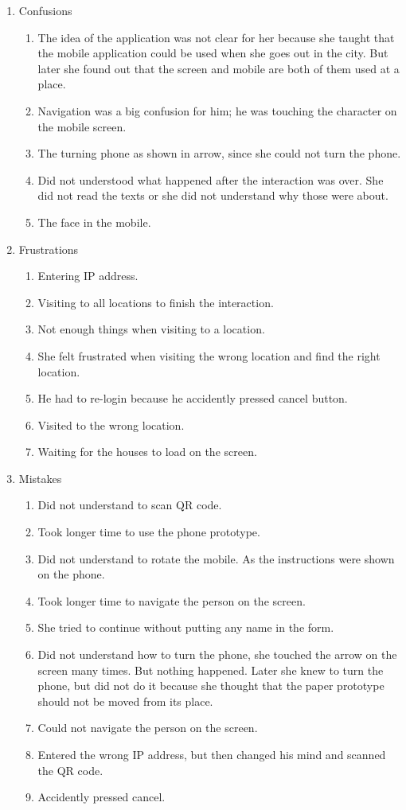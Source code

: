 \begin{enumerate}

\item Confusions
\begin{enumerate}
\item  The idea of the application was not clear for her because she taught that the mobile application could be used when she goes out in the city. But later she found out that the screen and mobile are both of them used at a place.
\item  Navigation was a big confusion for him; he was touching the character on the mobile screen.
\item  The turning phone as shown in arrow, since she could not turn the phone.
\item  Did not understood what happened after the interaction was over. She did not read the texts or she did not understand why those were about.
\item  The face in the mobile.
\end{enumerate}

\item Frustrations
\begin{enumerate}
\item  Entering IP address.
\item  Visiting to all locations to finish the interaction.
\item  Not enough things when visiting to a location.
\item  She felt frustrated when visiting the wrong location and find the right location.
\item  He had to re-login because he accidently pressed cancel button.
\item  Visited to the wrong location.
\item  Waiting for the houses to load on the screen.
\end{enumerate}

\item Mistakes
\begin{enumerate}
\item  Did not understand to scan QR code.
\item  Took longer time to use the phone prototype. 
\item  Did not understand to rotate the mobile. As the instructions were shown on the phone.
\item  Took longer time to navigate the person on the screen.
\item  She tried to continue without putting any name in the form.
\item  Did not understand how to turn the phone, she touched the arrow on the screen many times. But nothing happened. Later she knew to turn the phone, but did not do it because she thought that the paper prototype should not be moved from its place.
\item  Could not navigate the person on the screen.
\item  Entered the wrong IP address, but then changed his mind and scanned the QR code.
\item  Accidently pressed cancel.
\end{enumerate}


\end{enumerate}
